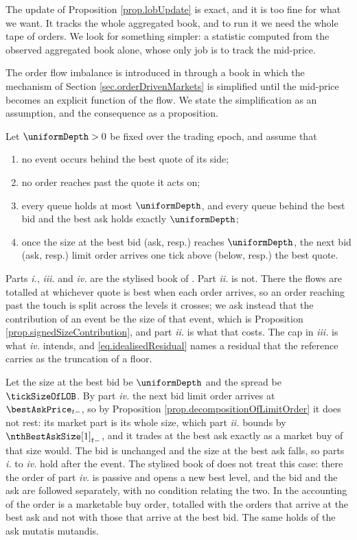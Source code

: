 The update of Proposition \ref{prop.lobUpdate} is exact, and it is too fine for what we want.
It tracks the whole aggregated book, and to run it we need the whole tape of orders.
We look for something simpler:
a statistic computed from the observed aggregated book alone,
whose only job is to track the mid-price.

The order flow imbalance is introduced in \cite{CKS14pri} through a book in which the
mechanism of Section \ref{sec.orderDrivenMarkets} is simplified until the mid-price becomes
an explicit function of the flow.
We state the simplification as an assumption, and the consequence as a proposition.

\begin{assumption}\label{assumption.idealisedBook}
 Let $\uniformDepth > 0$ be fixed over the trading epoch, and assume that
 \begin{enumerate}[label={\emph{\roman{*}}.}]
  \item no event occurs behind the best quote of its side;
  \item no order reaches past the quote it acts on;
  \item every queue holds at most $\uniformDepth$,
        and every queue behind the best bid and the best ask holds exactly
        $\uniformDepth$;
  \item once the size at the best bid (ask, resp.) reaches $\uniformDepth$,
        the next bid (ask, resp.) limit order arrives one tick above (below, resp.)
        the best quote.
 \end{enumerate}
\end{assumption}

Parts \emph{i.}, \emph{iii.} and \emph{iv.} are the stylised book of \cite{CKS14pri}.
Part \emph{ii.} is not.
There the flows are totalled at whichever quote is best when each order arrives,
so an order reaching past the touch is split across the levels it crosses;
we ask instead that the contribution of an event be the size of that event,
which is Proposition \ref{prop.signedSizeContribution},
and part \emph{ii.} is what that costs.
The cap in \emph{iii.} is what \emph{iv.} intends,
and \eqref{eq.idealisedResidual} names a residual that the reference carries as the
truncation of a floor.

Let the size at the best bid be $\uniformDepth$
and the spread be $\tickSizeOfLOB$.
By part \emph{iv.} the next bid limit order arrives at $\bestAskPrice_{t-}$,
so by Proposition \ref{prop.decompositionOfLimitOrder} it does not rest:
its market part is its whole size,
which part \emph{ii.} bounds by $\nthBestAskSize[1]_{t-}$,
and it trades at the best ask exactly as a market buy of that size would.
The bid is unchanged and the size at the best ask falls,
so parts \emph{i.} to \emph{iv.} hold after the event.
The stylised book of \cite{CKS14pri} does not treat this case:
there the order of part \emph{iv.} is passive and opens a new best level,
and the bid and the ask are followed separately,
with no condition relating the two.
In the accounting of \cite{CKS14pri} the order is a marketable buy order,
totalled with the orders that arrive at the best ask
and not with those that arrive at the best bid.
The same holds of the ask mutatis mutandis.

